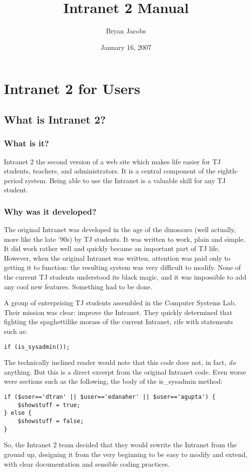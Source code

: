 \documentclass[11pt,letterpaper]{report}
\author{Bryan Jacobs}
\title{Intranet 2 Manual}
\date{January 16, 2007}
\begin{document}
\maketitle
\tableofcontents
\chapter{Intranet 2 for Users}
\section{What is Intranet 2?}
\subsection{What is it?}
Intranet 2 the second version of a web site which makes life easier for TJ students, teachers, and administrators.  
It is a central component of the eighth-period system.  Being able to use the Intranet is a valuable
skill for any TJ student.
\subsection{Why was it developed?}
The original Intranet was developed in the age of the dinosaurs (well actually, more like the late '90s) by TJ students.
It was written to work, plain and simple.  It did work rather well and quickly became an important part of TJ life.
However, when the original Intranet was written, attention was paid only to getting it to function: the resulting system
was very difficult to modify.  None of the current TJ students understood its black magic, and it was impossible to add
any cool new features.  Something had to be done.

A group of enterprising TJ students assembled in the Computer Systems Lab.  Their mission was clear: improve the Intranet.
They quickly determined that fighting the spaghettilike morass of the current Intranet, rife with statements such as:
\begin{lstlisting}
if (is_sysadmin());
\end{lstlisting}
The technically inclined reader would note that this code does not, in fact, \emph{do} anything.
But this is a direct excerpt from the original Intranet code.
Even worse were sections such as the following, the body of the is\_sysadmin method:
\begin{lstlisting}
if ($user=='dtran' || $user=='edanaher' || $user=='agupta') {
	$showstuff = true;
} else {
	$showstuff = false;
}
\end{lstlisting}
So, the Intranet 2 team decided that they would rewrite the Intranet from the ground up, designing it from the very beginning
to be easy to modify and extend, with clear documentation and sensible coding practices.
\end{document}

